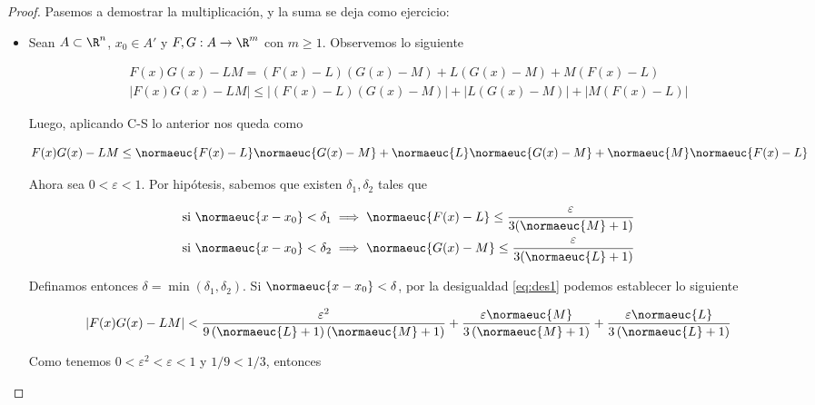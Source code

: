 \begin{proof}
    Pasemos a demostrar la multiplicación, y la suma se deja como ejercicio:
    
    \begin{itemize}
        \item Sean $A \subset \R^n$, $x_0 \in A'$ y $F,G: A \rightarrow \R^m$ con $m \geq 1$. Observemos lo siguiente
    
        \begin{gather*}
            F(x)G(x) - LM = \left(F(x) - L\right)\left(G(x) - M\right) + L\left(G(x) - M\right) + M\left(F(x) - L\right) \\
            \left| F(x)G(x) - LM \right| \leq \left| \left(F(x) - L\right)\left(G(x) - M\right)\right| + \left| L\left(G(x) - M\right) \right| + \left| M\left(F(x) - L\right) \right|
        \end{gather*}
        
        Luego, aplicando C-S lo anterior nos queda como
        
        \begin{equation}\label{eq:des1}
            F(x)G(x) - LM \leq \normaeuc{F(x) - L}\normaeuc{G(x) - M} + \normaeuc{L}\normaeuc{G(x)-M} + \normaeuc{M}\normaeuc{F(x)-L}
        \end{equation}
        
        Ahora sea $0 < \varepsilon < 1$. Por hipótesis, sabemos que existen $\delta_1, \delta_2$ tales que
        
        \begin{gather*}
            \text{si $\normaeuc{x - x_0} < \delta_1$} \implies \normaeuc{F(x) - L} \leq \frac{\varepsilon}{3(\normaeuc{M}+1)} \\
            \text{si $\normaeuc{x - x_0} < \delta_2$} \implies \normaeuc{G(x) - M} \leq \frac{\varepsilon}{3(\normaeuc{L}+1)}
        \end{gather*}
        
        Definamos entonces $\delta = \min(\delta_1, \delta_2)$. Si $\normaeuc{x - x_0} < \delta$, por la desigualdad \ref{eq:des1} podemos establecer lo siguiente
        
        \[
        \left| F(x)G(x) - LM \right| < \frac{\varepsilon^2}{9\left( \normaeuc{L} + 1 \right)\left( \normaeuc{M} + 1 \right)} + \frac{\varepsilon \normaeuc{M}}{3\left( \normaeuc{M} + 1 \right)} + \frac{\varepsilon \normaeuc{L}}{3 \left( \normaeuc{L} + 1 \right)}
        \]
        
        Como tenemos $0 < \varepsilon^2 < \varepsilon < 1$ y $1/9 < 1/3$, entonces
        

\end{itemize}
\end{proof}
